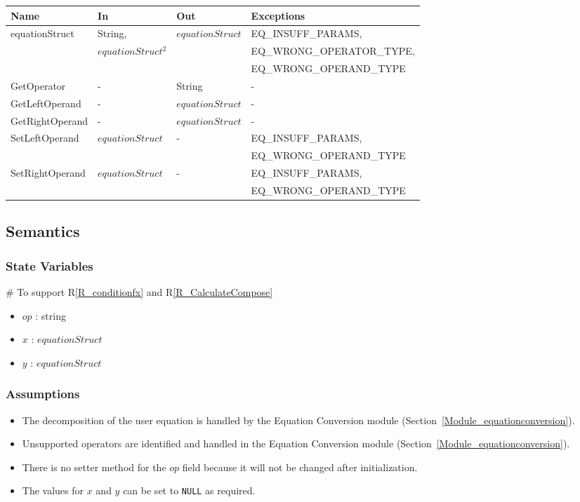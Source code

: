 \documentclass[12pt, titlepage]{article}
\newcommand{\rref}[1]{R\ref{#1}}
\begin{document}
\begin{center}
	\begin{tabular}{p{3cm} p{3cm} p{3cm} p{5cm}}
		\hline
		\textbf{Name} & \textbf{In} & \textbf{Out} & \textbf{Exceptions} \\
		\hline
		equationStruct & String,  & $equationStruct$ & 
		EQ\_INSUFF\_PARAMS,\\
		& $equationStruct^2$ & & EQ\_WRONG\_OPERATOR\_TYPE,\\
		& & & EQ\_WRONG\_OPERAND\_TYPE\\
		GetOperator & - & String & - \\
		GetLeftOperand & - & $equationStruct$ & -\\
		GetRightOperand & - & $equationStruct$ & - \\
		SetLeftOperand & $equationStruct$ & - & EQ\_INSUFF\_PARAMS,\\
		& & & EQ\_WRONG\_OPERAND\_TYPE\\
		SetRightOperand & $equationStruct$ & - & EQ\_INSUFF\_PARAMS,\\
		& & & EQ\_WRONG\_OPERAND\_TYPE\\
		\hline
	\end{tabular}
\end{center}

\subsection{Semantics}

\subsubsection{State Variables}

\# To support \rref{R_conditionfx} and \rref{R_CalculateCompose}
\begin{itemize}
	\item $op$ : string
	\item $x$ : $equationStruct$
	\item $y$ : $equationStruct$
\end{itemize}

\subsubsection{Assumptions}

\begin{itemize}
	\item The decomposition of the user equation is handled by the Equation 
	Conversion module (Section~\ref{Module_equationconversion}).
	\item Unsupported operators are identified and handled in the Equation 
	Conversion module (Section~\ref{Module_equationconversion}).
	\item There is no setter method for the $op$ field because it will not be 
	changed after initialization.
	\item The values for $x$ and $y$ can be set to \texttt{NULL} as required.
\end{itemize}
\end{document}
